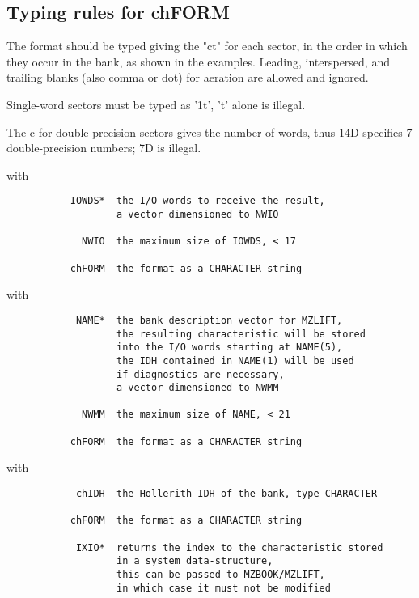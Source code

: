 \subsection*{Typing rules for chFORM}

The format should be typed giving the "ct" for each sector,
in the order in which they occur in the bank, as shown in the
examples.
Leading, interspersed, and trailing blanks (also comma or dot)
for aeration are allowed and ignored.

Single-word sectors must be typed as '1t', 't' alone is illegal.

The c for double-precision sectors gives the number of words,
thus 14D specifies 7 double-precision numbers; 7D is illegal.


with
\begin{verbatim}
           IOWDS*  the I/O words to receive the result,
                   a vector dimensioned to NWIO

             NWIO  the maximum size of IOWDS, < 17

           chFORM  the format as a CHARACTER string

\end{verbatim} 


with
\begin{verbatim}
            NAME*  the bank description vector for MZLIFT,
                   the resulting characteristic will be stored
                   into the I/O words starting at NAME(5),
                   the IDH contained in NAME(1) will be used
                   if diagnostics are necessary,
                   a vector dimensioned to NWMM

             NWMM  the maximum size of NAME, < 21

           chFORM  the format as a CHARACTER string

\end{verbatim} 

with
\begin{verbatim}
            chIDH  the Hollerith IDH of the bank, type CHARACTER

           chFORM  the format as a CHARACTER string

            IXIO*  returns the index to the characteristic stored
                   in a system data-structure,
                   this can be passed to MZBOOK/MZLIFT,
                   in which case it must not be modified
\end{verbatim} 

